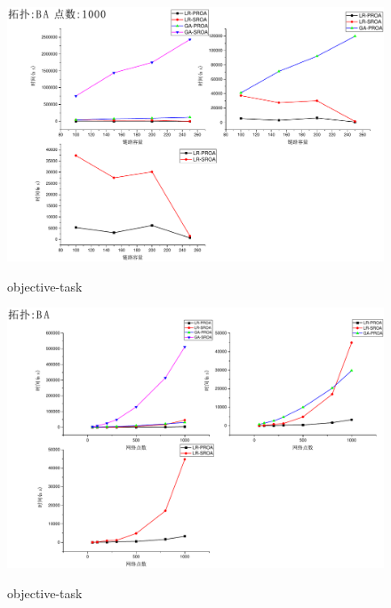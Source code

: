 \begin{figure}
\setlength{\belowcaptionskip}{-0.1cm}
  \begin{center}
    {\includegraphics[width=1 \textwidth]{figures/TI-BA-CA-1000.pdf}}
    \end{center}
  \caption{{\footnotesize{objective-task}}}
  \label{IterNum}
\end{figure}
\begin{figure}
\setlength{\belowcaptionskip}{-0.1cm}
  \begin{center}
    {\includegraphics[width=1 \textwidth]{figures/TI-BA-NO.pdf}}
    \end{center}
  \caption{{\footnotesize{objective-task}}}
  \label{IterNum}
\end{figure}

